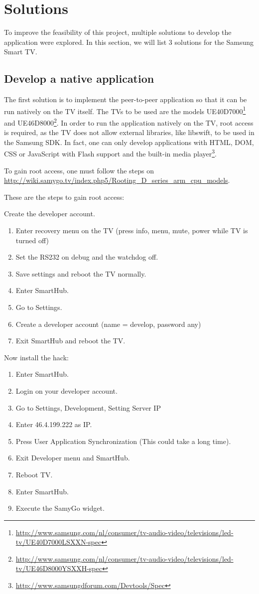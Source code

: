 \chapter{Solutions}

To improve the feasibility of this project, multiple solutions to develop the application were explored.
In this section, we will list 3 solutions for the Samsung Smart TV.


\section{Develop a native application}
\label{sec:smarttv}
The first solution is to implement the peer-to-peer application so that it can be run natively on the TV itself.
The TVs to be used are the models UE40D7000\footnote{\url{http://www.samsung.com/nl/consumer/tv-audio-video/televisions/led-tv/UE40D7000LSXXN-spec}} 
and UE46D8000\footnote{\url{http://www.samsung.com/nl/consumer/tv-audio-video/televisions/led-tv/UE46D8000YSXXH-spec}}.
In order to run the application natively on the TV, root access is required, 
as the TV does not allow external libraries, like libswift, to be used in the Samsung SDK.
In fact, one can only develop applications with HTML, DOM, CSS or JavaScript with Flash support and the built-in media player\footnote{\url{http://www.samsungdforum.com/Devtools/Spec}}.

To gain root access, one must follow the steps on \url{http://wiki.samygo.tv/index.php5/Rooting_D_series_arm_cpu_models}.

These are the steps to gain root access:

Create the developer account.
\begin{enumerate}
\item Enter recovery menu on the TV (press info, menu, mute, power while TV is turned off)
\item Set the RS232 on debug and the watchdog off.
\item Save settings and reboot the TV normally.
\item Enter SmartHub.
\item Go to Settings.
\item Create a developer account (name = develop, password any)
\item Exit SmartHub and reboot the TV.
\end{enumerate}

Now install the hack:

\begin{enumerate}
\item Enter SmartHub.
\item Login on your developer account.
\item Go to Settings, Development, Setting Server IP
\item Enter 46.4.199.222 as IP.
\item Press User Application Synchronization (This could take a long time).
\item Exit Developer menu and SmartHub.
\item Reboot TV.
\item Enter SmartHub.
\item Execute the SamyGo widget.
\end{enumerate} 


